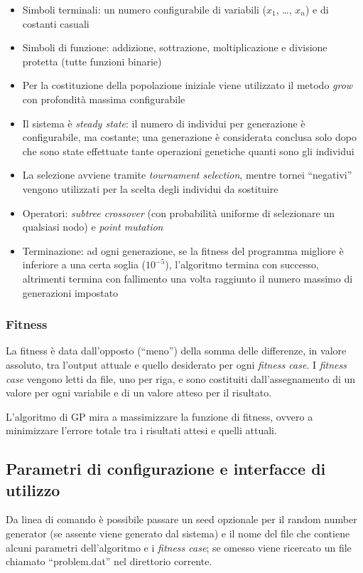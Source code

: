 \documentclass{../llncs}
\newcommand{\labelssec}[1]{\label{ssec:#1}}
\begin{document}
\begin{itemize}
\item Simboli terminali: un numero configurabile di variabili ($x_1$, \ldots, $x_n$) e di costanti casuali
\item Simboli di funzione: addizione, sottrazione, moltiplicazione e divisione protetta (tutte funzioni binarie)
\item Per la costituzione della popolazione iniziale viene utilizzato il metodo \emph{grow} con profondità massima configurabile
\item Il sistema è \emph{steady state}: il numero di individui per generazione è configurabile, ma costante; una generazione è considerata conclusa solo dopo che sono state effettuate tante operazioni genetiche quanti sono gli individui
\item La selezione avviene tramite \emph{tournament selection}, mentre tornei ``negativi'' vengono utilizzati per la scelta degli individui da sostituire
\item Operatori: \emph{subtree crossover} (con probabilità uniforme di selezionare un qualsiasi nodo) e \emph{point mutation}
\item Terminazione: ad ogni generazione, se la fitness del programma migliore è inferiore a una certa soglia ($10^{-5}$), l'algoritmo termina con successo, altrimenti termina con fallimento una volta raggiunto il numero massimo di generazioni impostato
\end{itemize}

\subsubsection{Fitness}
La fitness è data dall'opposto (``meno'') della somma delle differenze, in valore assoluto, tra l'output attuale e quello desiderato per ogni \emph{fitness case}.
I \emph{fitness case} vengono letti da file, uno per riga, e sono costituiti dall'assegnamento di un valore per ogni variabile e di un valore atteso per il risultato.

L'algoritmo di GP mira a massimizzare la funzione di fitness, ovvero a minimizzare l'errore totale tra i risultati attesi e quelli attuali.

\subsection{Parametri di configurazione e interfacce di utilizzo}
\labelssec{TinyGP_parameters}

Da linea di comando è possibile passare un seed opzionale per il random number generator (se assente viene generato dal sistema) e il nome del file che contiene alcuni parametri dell'algoritmo e i \emph{fitness case}; se omesso viene ricercato un file chiamato ``problem.dat'' nel direttorio corrente.\\
\end{document}
